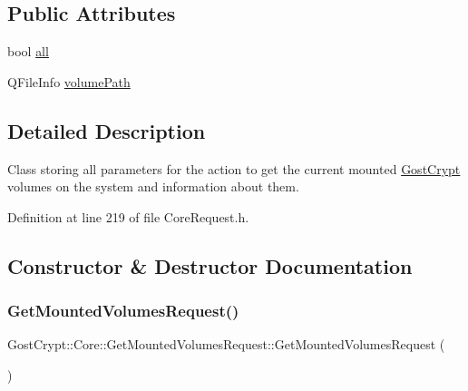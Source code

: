\subsection*{Public Attributes}
\begin{DoxyCompactItemize}
\item 
bool \hyperlink{struct_gost_crypt_1_1_core_1_1_get_mounted_volumes_request_a4009018d19bb773e3448e6f88a85e2e1}{all}
\item 
Q\+File\+Info \hyperlink{struct_gost_crypt_1_1_core_1_1_get_mounted_volumes_request_a35dd833582b8801245d0dd61f31907cb}{volume\+Path}
\end{DoxyCompactItemize}


\subsection{Detailed Description}
Class storing all parameters for the action to get the current mounted \hyperlink{namespace_gost_crypt}{Gost\+Crypt} volumes on the system and information about them. 

Definition at line 219 of file Core\+Request.\+h.



\subsection{Constructor \& Destructor Documentation}
\mbox{\label{struct_gost_crypt_1_1_core_1_1_get_mounted_volumes_request_a9eb7c5f0db25b5b4800d4613456b9fe1}} 
\subsubsection{\texorpdfstring{Get\+Mounted\+Volumes\+Request()}{GetMountedVolumesRequest()}}
{\footnotesize\ttfamily Gost\+Crypt\+::\+Core\+::\+Get\+Mounted\+Volumes\+Request\+::\+Get\+Mounted\+Volumes\+Request (\begin{DoxyParamCaption}{ }\end{DoxyParamCaption})}



